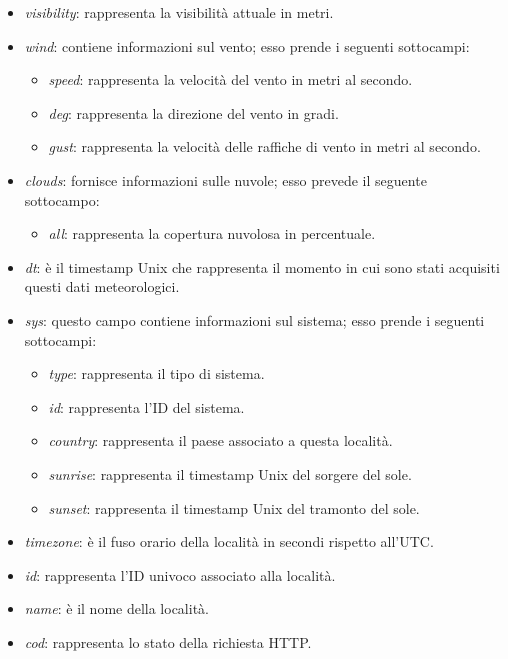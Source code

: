\begin{itemize}
    \item \textit{visibility}: rappresenta la visibilità attuale in metri.
    \item \textit{wind}: contiene informazioni sul vento; esso prende i seguenti sottocampi:
    \begin{itemize}
        \item \textit{speed}: rappresenta la velocità del vento in metri al secondo.
        \item \textit{deg}: rappresenta la direzione del vento in gradi.
        \item \textit{gust}: rappresenta la velocità delle raffiche di vento in metri al secondo.
    \end{itemize}
    
    \item \textit{clouds}: fornisce informazioni sulle nuvole; esso prevede il seguente sottocampo:
    \begin{itemize}
        \item \textit{all}: rappresenta la copertura nuvolosa in percentuale.
    \end{itemize}
        
    \item \textit{dt}: è il timestamp Unix che rappresenta il momento in cui sono stati acquisiti questi dati meteorologici.
    \item \textit{sys}: questo campo contiene informazioni sul sistema; esso prende i seguenti sottocampi:
    \begin{itemize}
        \item \textit{type}: rappresenta il tipo di sistema.
        \item \textit{id}: rappresenta l'ID del sistema.
        \item \textit{country}: rappresenta il paese associato a questa località.
        \item \textit{sunrise}: rappresenta il timestamp Unix del sorgere del sole.
        \item \textit{sunset}: rappresenta il timestamp Unix del tramonto del sole.
    \end{itemize}
        
    \item \textit{timezone}: è il fuso orario della località in secondi rispetto all'UTC. 
    \item \textit{id}: rappresenta l'ID univoco associato alla località.
    \item \textit{name}: è il nome della località.
    \item \textit{cod}: rappresenta lo stato della richiesta HTTP.
\end{itemize}

